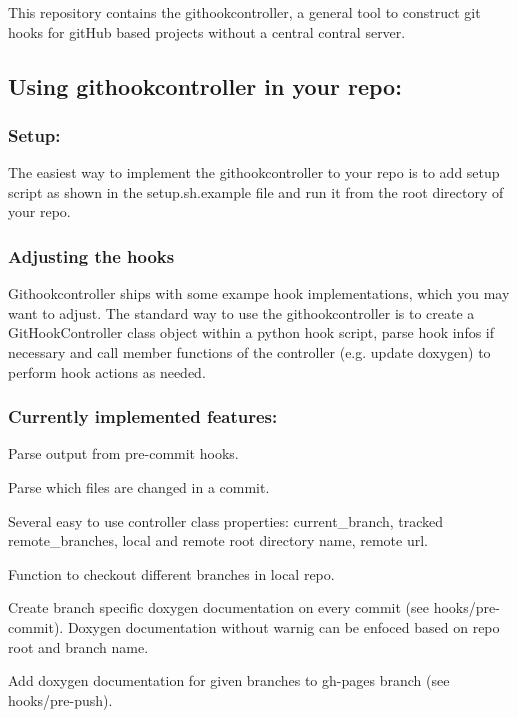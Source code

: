 This repository contains the githookcontroller, a general tool to construct git hooks for git\-Hub based projects without a central contral server.

\subsection*{Using githookcontroller in your repo\-:}

\subsubsection*{Setup\-:}

The easiest way to implement the githookcontroller to your repo is to add setup script as shown in the setup.\-sh.\-example file and run it from the root directory of your repo. \subsubsection*{Adjusting the hooks}

Githookcontroller ships with some exampe hook implementations, which you may want to adjust. The standard way to use the githookcontroller is to create a Git\-Hook\-Controller class object within a python hook script, parse hook infos if necessary and call member functions of the controller (e.\-g. update doxygen) to perform hook actions as needed.

\subsubsection*{Currently implemented features\-:}


\begin{DoxyItemize}
\item Parse output from pre-\/commit hooks.
\item Parse which files are changed in a commit.
\item Several easy to use controller class properties\-: current\-\_\-branch, tracked remote\-\_\-branches, local and remote root directory name, remote url.
\item Function to checkout different branches in local repo.
\item Create branch specific doxygen documentation on every commit (see hooks/pre-\/commit). Doxygen documentation without warnig can be enfoced based on repo root and branch name.
\item Add doxygen documentation for given branches to gh-\/pages branch (see hooks/pre-\/push). 
\end{DoxyItemize}